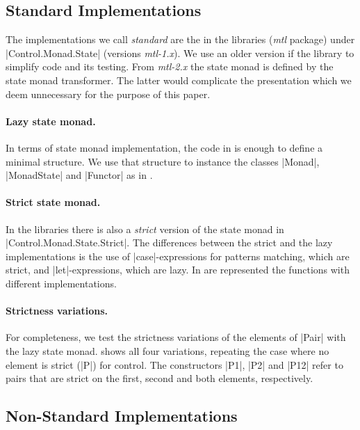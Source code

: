 \subsection*{Standard Implementations}


The implementations we call \emph{standard} are the in the libraries
(\emph{mtl} package) under |Control.Monad.State| (versions
\emph{mtl-1.x}).
%
We use an older version if the library to simplify code and its testing.
%
From \emph{mtl-2.x} the state monad is defined by the state monad
transformer.
%
The latter would complicate the presentation which we deem unnecessary
for the purpose of this paper.


\paragraph{Lazy state monad.}
In terms of state monad implementation, the code in 
is enough to define a minimal structure.
%
We use that structure to instance the classes |Monad|, |MonadState|
and |Functor| as in .


\paragraph{Strict state monad.}
In the libraries there is also a \emph{strict} version of the state
monad in |Control.Monad.State.Strict|.
%
The differences between the strict and the lazy implementations is the
use of |case|-expressions for patterns matching, which are strict, and
|let|-expressions, which are lazy.
%
In  are represented the functions with different
implementations.


\paragraph{Strictness variations.}
For completeness, we test the strictness variations of the elements of
|Pair| with the lazy state monad.
%
 shows all four variations, repeating the
case where no element is strict (|P|) for control.
%
The constructors |P1|, |P2| and |P12| refer to pairs that are strict
on the first, second and both elements, respectively.


\subsection*{Non-Standard Implementations}

